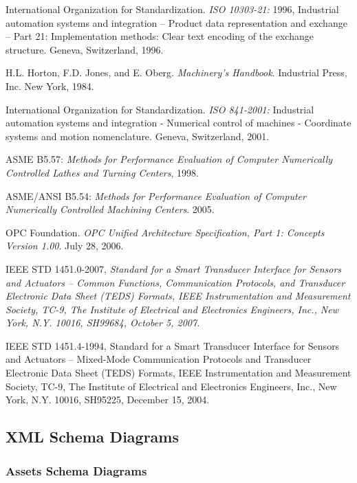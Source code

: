 International Organization for Standardization. \textit{ISO 10303-21:} 1996, Industrial automation systems and integration -- Product data representation and exchange -- Part 21: Implementation methods: Clear text encoding of the exchange structure. Geneva, Switzerland, 1996.

H.L. Horton, F.D. Jones, and E. Oberg. \textit{Machinery's Handbook}. Industrial Press, Inc. New York, 1984.

International Organization for Standardization. \textit{ISO 841-2001:} Industrial automation systems and integration - Numerical control of machines - Coordinate systems and motion nomenclature. Geneva, Switzerland, 2001.

ASME B5.57: \textit{Methods for Performance Evaluation of Computer Numerically Controlled Lathes and Turning Centers}, 1998.

ASME/ANSI B5.54: \textit{Methods for Performance Evaluation of Computer Numerically Controlled Machining Centers}. 2005.

OPC Foundation. \textit{OPC Unified Architecture Specification, Part 1: Concepts Version 1.00}. July 28, 2006.

IEEE STD 1451.0-2007, \textit{Standard for a Smart Transducer Interface for Sensors and Actuators – Common Functions, Communication Protocols, and Transducer Electronic Data Sheet (TEDS) Formats, IEEE Instrumentation and Measurement Society, TC-9, The Institute of Electrical and Electronics Engineers, Inc., New York, N.Y. 10016, SH99684, October 5, 2007.}

IEEE STD 1451.4-1994, Standard for a Smart Transducer Interface for Sensors and Actuators – Mixed-Mode Communication Protocols and Transducer Electronic Data Sheet (TEDS) Formats, IEEE Instrumentation and Measurement Society, TC-9, The Institute of Electrical and Electronics Engineers, Inc., New York, N.Y. 10016, SH95225, December 15, 2004. \newpage 

\subsection{XML Schema Diagrams}
\label{sec:XML Schema Diagrams}

\subsubsection{Assets Schema Diagrams}
\label{sec:Assets Schema Diagrams}

